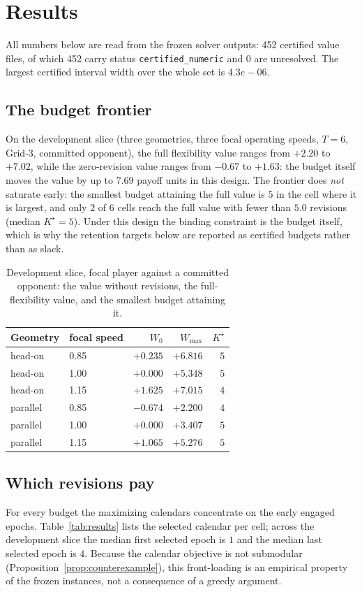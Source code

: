 \section{Results}\label{sec:results}

All numbers below are read from the frozen solver outputs: 452 certified value files, of which 452 carry status \texttt{certified\_numeric} and 0 are unresolved. The largest certified interval width over the whole set is $4.3e-06$.

\subsection{The budget frontier}
On the development slice (three geometries, three focal operating speeds, $T=6$, Grid-3, committed opponent), the full flexibility value ranges from $+2.20$ to $+7.02$, while the zero-revision value ranges from $-0.67$ to $+1.63$: the budget itself moves the value by up to $7.69$ payoff units in this design. The frontier does \emph{not} saturate early: the smallest budget attaining the full value is $5$ in the cell where it is largest, and only $2$ of $6$ cells reach the full value with fewer than $5.0$ revisions (median $K^{\star}=5$). Under this design the binding constraint is the budget itself, which is why the retention targets below are reported as certified budgets rather than as slack.

\begin{table}[!htb]\centering\small
\caption{Development slice, focal player against a committed opponent: the value without revisions, the full-flexibility value, and the smallest budget attaining it.}
\label{tab:devfrontier}
\begin{tabular}{llrrr}
\toprule
Geometry & focal speed & $W_0$ & $W_{\max}$ & $K^\star$ \\
\midrule
head-on & 0.85 & $+0.235$ & $+6.816$ & $5$ \\
head-on & 1.00 & $+0.000$ & $+5.348$ & $5$ \\
head-on & 1.15 & $+1.625$ & $+7.015$ & $4$ \\
parallel & 0.85 & $-0.674$ & $+2.200$ & $4$ \\
parallel & 1.00 & $+0.000$ & $+3.407$ & $5$ \\
parallel & 1.15 & $+1.065$ & $+5.276$ & $5$ \\
\bottomrule
\end{tabular}
\end{table}

\subsection{Which revisions pay}
For every budget the maximizing calendars concentrate on the early engaged epochs. Table~\ref{tab:results} lists the selected calendar per cell; across the development slice the median first selected epoch is $1$ and the median last selected epoch is $4$. Because the calendar objective is not submodular (Proposition~\ref{prop:counterexample}), this front-loading is an empirical property of the frozen instances, not a consequence of a greedy argument.

